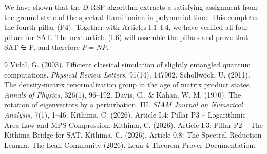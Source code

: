 \documentclass[11pt,a4paper]{article}
\begin{document}
We have shown that the D‑RSP algorithm extracts a satisfying assignment from the ground state of the spectral Hamiltonian in polynomial time. This completes the fourth pillar (P4). Together with Articles I.1–I.4, we have verified all four pillars for SAT. The next article (I.6) will assemble the pillars and prove that SAT ∈ P, and therefore \(P = NP\).


\begin{thebibliography}{9}
  Vidal, G. (2003). Efficient classical simulation of slightly entangled quantum computations. \emph{Physical Review Letters}, 91(14), 147902.
  Schollwöck, U. (2011). The density‑matrix renormalization group in the age of matrix product states. \emph{Annals of Physics}, 326(1), 96–192.
  Davis, C., \& Kahan, W. M. (1970). The rotation of eigenvectors by a perturbation. III. \emph{SIAM Journal on Numerical Analysis}, 7(1), 1–46.
  Kithima, C. (2026). Article I.4: Pillar P3 – Logarithmic Area Law and MPS Compression.
  Kithima, C. (2026). Article I.3: Pillar P2 – The Kithima Bridge for SAT.
  Kithima, C. (2026). Article 0.8: The Spectral Reduction Lemma.
  The Lean Community (2026). Lean 4 Theorem Prover Documentation.
\end{thebibliography}
\end{document}
